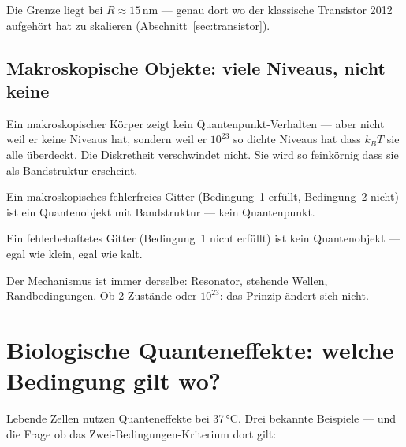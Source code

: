 Die Grenze liegt bei $R \approx 15$\,nm --- genau dort
wo der klassische Transistor 2012 aufgehört hat zu skalieren
(Abschnitt~\ref{sec:transistor}).

\subsection{Makroskopische Objekte: viele Niveaus, nicht keine}

Ein makroskopischer Körper zeigt kein Quantenpunkt-Verhalten ---
aber nicht weil er keine Niveaus hat, sondern weil er
$10^{23}$ so dichte Niveaus hat dass $k_BT$ sie alle überdeckt.
Die Diskretheit verschwindet nicht. Sie wird so feinkörnig
dass sie als Bandstruktur erscheint.

\begin{keypoint}
Ein makroskopisches fehlerfreies Gitter (Bedingung~1 erfüllt,
Bedingung~2 nicht) ist ein Quantenobjekt mit Bandstruktur ---
kein Quantenpunkt.

Ein fehlerbehaftetes Gitter (Bedingung~1 nicht erfüllt)
ist kein Quantenobjekt --- egal wie klein, egal wie kalt.

Der Mechanismus ist immer derselbe: Resonator, stehende Wellen,
Randbedingungen. Ob 2 Zustände oder $10^{23}$: das Prinzip
ändert sich nicht.
\end{keypoint}

\section{Biologische Quanteneffekte: welche Bedingung gilt wo?}
\label{sec:bio}

Lebende Zellen nutzen Quanteneffekte bei 37\,°C.
Drei bekannte Beispiele --- und die Frage ob das
Zwei-Bedingungen-Kriterium dort gilt:

